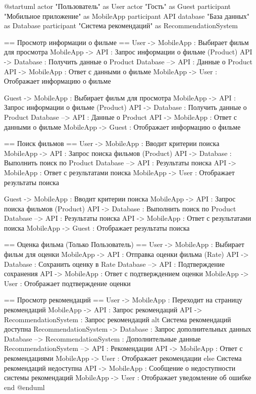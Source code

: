 @startuml
actor "Пользователь" as User
actor "Гость" as Guest
participant "Мобильное приложение" as MobileApp
participant API
database "База данных" as Database
participant "Система рекомендаций" as RecommendationSystem

== Просмотр информации о фильме ==
User -> MobileApp : Выбирает фильм для просмотра
MobileApp -> API : Запрос информации о фильме (Product)
API -> Database : Получить данные о Product
Database --> API : Данные о Product
API -> MobileApp : Ответ с данными о фильме
MobileApp -> User : Отображает информацию о фильме

Guest -> MobileApp : Выбирает фильм для просмотра
MobileApp -> API : Запрос информации о фильме (Product)
API -> Database : Получить данные о Product
Database --> API : Данные о Product
API -> MobileApp : Ответ с данными о фильме
MobileApp -> Guest : Отображает информацию о фильме

== Поиск фильмов ==
User -> MobileApp : Вводит критерии поиска
MobileApp -> API : Запрос поиска фильмов (Product)
API -> Database : Выполнить поиск по Product
Database --> API : Результаты поиска
API -> MobileApp : Ответ с результатами поиска
MobileApp -> User : Отображает результаты поиска

Guest -> MobileApp : Вводит критерии поиска
MobileApp -> API : Запрос поиска фильмов (Product)
API -> Database : Выполнить поиск по Product
Database --> API : Результаты поиска
API -> MobileApp : Ответ с результатами поиска
MobileApp -> Guest : Отображает результаты поиска

== Оценка фильма (Только Пользователь) ==
User -> MobileApp : Выбирает фильм для оценки
MobileApp -> API : Отправка оценки фильма (Rate)
API -> Database : Сохранить оценку в Rate
Database --> API : Подтверждение сохранения
API -> MobileApp : Ответ с подтверждением оценки
MobileApp -> User : Отображает подтверждение оценки

== Просмотр рекомендаций ==
User -> MobileApp : Переходит на страницу рекомендаций
MobileApp -> API : Запрос рекомендаций
API -> RecommendationSystem : Запрос рекомендаций
alt Система рекомендаций доступна
RecommendationSystem -> Database : Запрос дополнительных данных
Database --> RecommendationSystem : Дополнительные данные
RecommendationSystem --> API : Рекомендации
API -> MobileApp : Ответ с рекомендациями
MobileApp -> User : Отображает рекомендации
else Система рекомендаций недоступна
API -> MobileApp : Сообщение о недоступности системы рекомендаций
MobileApp -> User : Отображает уведомление об ошибке
end
@enduml
